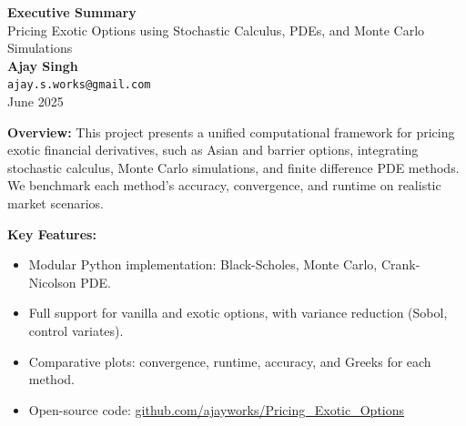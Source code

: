 \documentclass[11pt,a4paper]{article}
\begin{document}
\begin{center}
    {\LARGE \textbf{Executive Summary}} \\[1.5mm]
    
    {\Large Pricing Exotic Options using Stochastic Calculus, PDEs, and Monte Carlo Simulations} \\[2mm]
    
    \textbf{Ajay Singh} \\
    \texttt{ajay.s.works@gmail.com} \\
    June 2025
\end{center}
\vspace{3mm}
\noindent
\textbf{Overview:}
This project presents a unified computational framework for pricing exotic financial derivatives, such as Asian and barrier options, integrating stochastic calculus, Monte Carlo simulations, and finite difference PDE methods. We benchmark each method's accuracy, convergence, and runtime on realistic market scenarios.

\vspace{1mm}
\noindent
\textbf{Key Features:}
\begin{itemize}[leftmargin=10pt, itemsep=0pt, parsep=0pt]
    \item Modular Python implementation: Black-Scholes, Monte Carlo, Crank-Nicolson PDE.
    \item Full support for vanilla and exotic options, with variance reduction (Sobol, control variates).
    \item Comparative plots: convergence, runtime, accuracy, and Greeks for each method.
    \item Open-source code: \href{https://github.com/ajayworks/Pricing_Exotic_Options}{github.com/ajayworks/Pricing\_Exotic\_Options}
\end{itemize}
\end{document}
